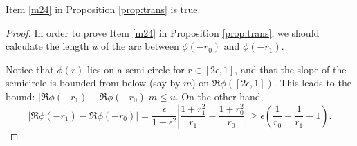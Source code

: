 {\begin{cor}\label{m24true}
Item \ref{m24} in Proposition \ref{prop:trans} is true.
\end{cor}
\begin{proof}

In order to prove Item \ref{m24} in Proposition \ref{prop:trans}, we should calculate the length $u$ of the arc between $\phi(-r_0)$ and $\phi(-r_1)$.

Notice that $\phi(r)$ lies on a semi-circle for $r\in[2\epsilon,1]$,
and that the slope of the semicircle is bounded from below (say by
$m$) on $\Re\phi([2\epsilon,1])$. This leads to the bound:
$|\Re\phi(-r_1)-\Re\phi(-r_0)| m \le u$.
On the other hand,
\[|\Re\phi(-r_1)-\Re\phi(-r_0)|
=
\frac{\epsilon}{1+\epsilon^2}\left|\frac{1+r_1^2}{r_1}-\frac{1+r_0^2}{r_0}\right|
\ge\epsilon\left(\frac1 {r_0} - \frac 1{r_1}-1 \right).\]


\end{proof}
}
